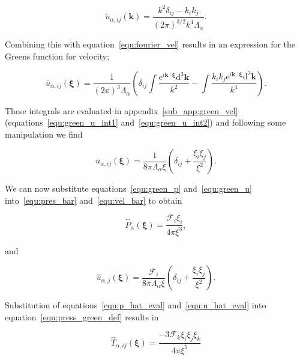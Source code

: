 \documentclass[12pt]{article}
\begin{document}
\begin{equation}
\label{equ:fourier_green_u}
\tilde{u}_{\alpha,ij} (\boldsymbol{k}) = \frac{k^{2} \delta_{ij} - k_{i} k_{j}}{(2 \pi)^{3/2} k^{4} \Lambda_{\alpha}} .
\end{equation}

Combining this with equation~\ref{equ:fourier_vel} results in an expression for the Greens function for velocity;

\begin{equation}
\label{equ:green_u_int}
\bar{u}_{\alpha,ij} (\boldsymbol\xi) = \frac{1}{(2 \pi)^{3} \Lambda_{\alpha}} \left(\delta_{ij} \int \frac{\mathrm{e}^{i \boldsymbol{k} \cdot \boldsymbol\xi} \mathrm{d}^{3} \boldsymbol{k}}{k^{2}} - \int \frac{k_{i} k_{j} \mathrm{e}^{i \boldsymbol{k} \cdot \boldsymbol\xi} \mathrm{d}^{3} \boldsymbol{k}}{k^{4}} \right).
\end{equation}

These integrals are evaluated in appendix~\ref{sub_app:green_vel} (equations~\ref{equ:green_u_int1} and~\ref{equ:green_u_int2}) and following some manipulation we find

\begin{equation}
\label{equ:green_u}
\bar{u}_{\alpha,ij} (\boldsymbol\xi) = \frac{1}{8 \pi \Lambda_{\alpha} \xi} \left(\delta_{ij} + \frac{\xi_{i} \xi_{j}}{\xi^{2}} \right).
\end{equation}

We can now substitute equations~\ref{equ:green_p} and~\ref{equ:green_u} into~\ref{equ:pres_bar} and~\ref{equ:vel_bar} to obtain

\begin{equation}
\label{equ:p_hat_eval}
\hat{P}_{\alpha} (\boldsymbol\xi) = \frac{\mathcal{F}_{i} \xi_{i}}{4 \pi \xi^{3}},
\end{equation}

and 

\begin{equation}
\label{equ:u_hat_eval}
\hat{u}_{\alpha,j}(\boldsymbol\xi) = \frac{\mathcal{F}_{i}}{8 \pi \Lambda_{\alpha} \xi} \left(\delta_{ij} + \frac{\xi_{i} \xi_{j}}{\xi^{2}} \right).
\end{equation}


Substitution of equations~\ref{equ:p_hat_eval} and~\ref{equ:u_hat_eval} into equation~\ref{equ:press_green_def} results in

\begin{equation}
\label{equ:green_stress}
\hat{T}_{\alpha, ij} (\boldsymbol\xi) = \frac{-3 \mathcal{F}_{k} \xi_{i} \xi_{j} \xi_{k}}{4 \pi \xi^{5}}
\end{equation}
\end{document}
